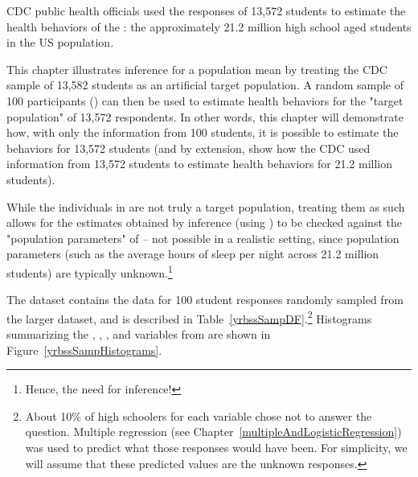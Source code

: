 \begin{spacing}{1.5}

CDC public health officials used the responses of 13,572 students to estimate the health behaviors of the : the approximately 21.2 million high school aged students in the US population. 

This chapter illustrates inference for a population mean by treating the CDC sample of 13,582 students as an artificial target population. A random sample of 100 participants () can then be used to estimate health behaviors for the "target population" of 13,572 respondents. In other words, this chapter will demonstrate how, with only the information from 100 students, it is possible to estimate the behaviors for 13,572 students (and by extension, show how the CDC used information from 13,572 students to estimate health behaviors for 21.2 million students).  

While the individuals in  are not truly a target population, treating them as such allows for the estimates obtained by inference (using ) to be checked against the "population parameters" of  -- not possible in a realistic setting, since population parameters (such as the average hours of sleep per night across 21.2 million students) are typically unknown.\footnote{Hence, the need for inference!}

The dataset  contains the data for 100 student responses randomly sampled from the larger  dataset, and is described in Table~\ref{yrbssSampDF}.\footnote{About 10\% of high schoolers for each variable chose not to answer the question. Multiple regression (see Chapter~\ref{multipleAndLogisticRegression}) was used to predict what those responses would have been. For simplicity, we will assume that these predicted values are the unknown responses.} Histograms summarizing the , , , and  variables from  are shown in Figure~\ref{yrbssSampHistograms}.


\end{spacing}
